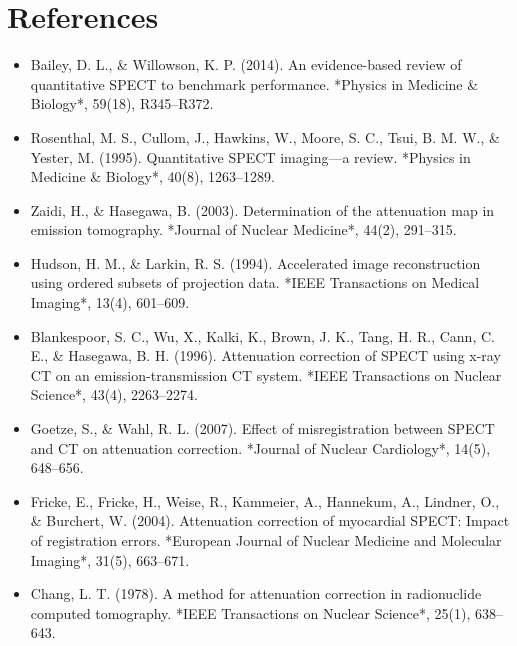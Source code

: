 \documentclass[11pt]{article}
\begin{document}
\section*{References}
\begin{itemize}\item  Bailey, D. L., \& Willowson, K. P. (2014). An evidence-based review of quantitative SPECT to benchmark performance. *Physics in Medicine \& Biology*, 59(18), R345–R372.\end{itemize}
\begin{itemize}\item  Rosenthal, M. S., Cullom, J., Hawkins, W., Moore, S. C., Tsui, B. M. W., \& Yester, M. (1995). Quantitative SPECT imaging—a review. *Physics in Medicine \& Biology*, 40(8), 1263–1289.\end{itemize}
\begin{itemize}\item  Zaidi, H., \& Hasegawa, B. (2003). Determination of the attenuation map in emission tomography. *Journal of Nuclear Medicine*, 44(2), 291–315.\end{itemize}
\begin{itemize}\item  Hudson, H. M., \& Larkin, R. S. (1994). Accelerated image reconstruction using ordered subsets of projection data. *IEEE Transactions on Medical Imaging*, 13(4), 601–609.\end{itemize}
\begin{itemize}\item  Blankespoor, S. C., Wu, X., Kalki, K., Brown, J. K., Tang, H. R., Cann, C. E., \& Hasegawa, B. H. (1996). Attenuation correction of SPECT using x-ray CT on an emission-transmission CT system. *IEEE Transactions on Nuclear Science*, 43(4), 2263–2274.\end{itemize}
\begin{itemize}\item  Goetze, S., \& Wahl, R. L. (2007). Effect of misregistration between SPECT and CT on attenuation correction. *Journal of Nuclear Cardiology*, 14(5), 648–656.\end{itemize}
\begin{itemize}\item  Fricke, E., Fricke, H., Weise, R., Kammeier, A., Hannekum, A., Lindner, O., \& Burchert, W. (2004). Attenuation correction of myocardial SPECT: Impact of registration errors. *European Journal of Nuclear Medicine and Molecular Imaging*, 31(5), 663–671.\end{itemize}
\begin{itemize}\item  Chang, L. T. (1978). A method for attenuation correction in radionuclide computed tomography. *IEEE Transactions on Nuclear Science*, 25(1), 638–643.\end{itemize}
\end{document}
